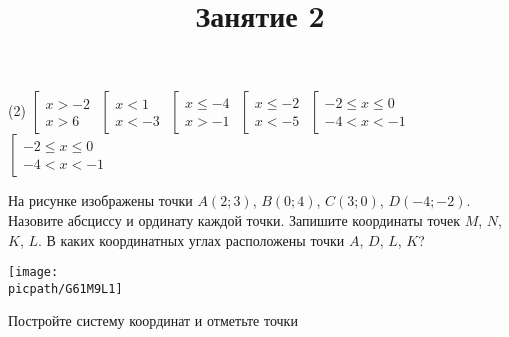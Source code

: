 \begin{class}[number=1-2]
\begin{listofex}
		\begin{tasks}(2)
			\task \( \left[ 
			\begin{array}{l}
				x>-2\\
				x>6
			\end{array}
			\right. \)
			\task \( \left[
			\begin{array}{l} x<1 \\ x<-3 \end{array} \right. \)
			\task \( \left[
			\begin{array}{l} x \le -4 \\ x>-1 \end{array} \right. \)
			\task \( \left[
			\begin{array}{l} x \le -2 \\ x < -5 \end{array} \right. \)
			\task \( \left[
			\begin{array}{l} -2 \le x \le 0 \\ -4 < x < -1 \end{array} \right. \)
			\task \( \left[
			\begin{array}{l} -2 \le x \le 0 \\ -4<x<-1 \end{array} \right. \)
		\end{tasks}
	\end{listofex}
	\title{Занятие 2}
	\begin{listofex}[resume]
		\item
		\begin{minipage}[c]{0.6\linewidth}
			На рисунке изображены точки \( A (2;3) \), \( B(0;4) \), \( C(3;0) \), \( D(-4;-2) \). Назовите абсциссу и ординату каждой точки. Запишите координаты точек \( M \), \( N \), \( K \), \( L \). В каких координатных углах расположены точки \( A \), \( D \), \( L \), \( K \)?
		\end{minipage}
		\begin{minipage}[c]{0.4\linewidth}
			\texttt{[image: \\picpath/G61M9L1]}
		\end{minipage}
		\item Постройте систему координат и отметьте точки

\end{listofex}
\end{class}
